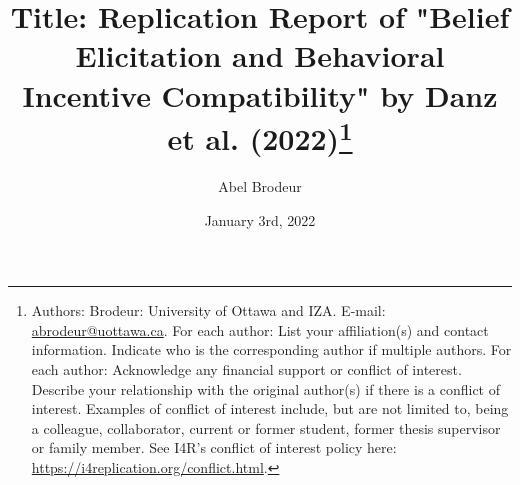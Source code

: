 \documentclass[12pt,a4paper]{article}
\begin{document}
	
	\date{January 3rd, 2022}
	
	\title{Title: Replication Report of "Belief Elicitation and Behavioral Incentive Compatibility" by  Danz et al. (2022)\thanks{Authors: 
			Brodeur: University of Ottawa and IZA. E-mail: \href{mailto:abrodeur@uottawa.ca}%
			{abrodeur@uottawa.ca}. For each author: List your affiliation(s) and contact information. Indicate who is the corresponding author if multiple authors. For each author: Acknowledge any financial support or conflict of interest. Describe your relationship with the original author(s) if there is a conflict of interest. Examples of conflict of interest include, but are not limited to, being a colleague, collaborator, current or former student, former thesis supervisor or family member. See I4R’s conflict of interest policy here: \url{https://i4replication.org/conflict.html}.}}
	\author{Abel Brodeur}
	
	\maketitle
	
\end{document}
